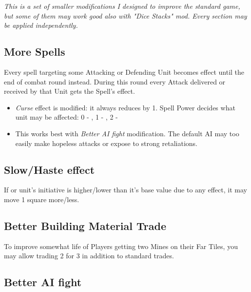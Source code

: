 
\textit{This is a set of smaller modifications I designed to improve the standard game, but some of them may work good also with "Dice Stacks" mod. Every section may be applied independently.}

\begin{multicols*}{2}
    
    \subsection*{More  Spells}
    
    Every  spell targeting some Attacking or Defending Unit becomes  effect until the end of combat round instead. During this round every Attack delivered or received by that Unit gets the Spell's effect.
    
    \begin{itemize}
        \item \emph{Curse} effect is modified: it always reduces  by 1. Spell Power decides what unit may be affected: 0 - \bronze, 1 - \bronze \silver, 2 - \bronze \silver \golden
        \item This works best with \textit{Better AI fight} modification. The default AI may too easily make hopeless attacks or expose to strong retaliations.
    \end{itemize}
    
    \subsection*{Slow/Haste effect}
    
    If  or  unit's initiative is higher/lower than it's base value due to any effect, it may move 1 square more/less.
    
    \subsection*{Better Building Material Trade}
    
    To improve somewhat life of Players getting two  Mines on their Far Tiles, you may allow trading 2  for 3  in addition to standard trades.
    
    \subsection*{Better AI fight}
    

\end{multicols*}
